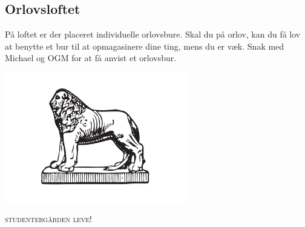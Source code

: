 \documentclass[11pt,article,twoside,openany,danish,extrafontsizes]{memoir} %
\begin{document}
\subsection{Orlovsloftet}
På loftet er der placeret individuelle orlovsbure. Skal du på orlov, kan du få lov at benytte et bur til at opmagasinere dine ting, mens du er væk. Snak med Michael og OGM for at få anvist et orlovsbur.




\clearpage

\thispagestyle{empty}
\begin{vplace}[0.75]
\begin{adjustwidth}{-2cm}{-1.5cm}
\begin{center}

\includegraphics[width=8cm]{fig/SG_loeve_vektor}

\bigskip

{\LARGE \scshape studentergården leve!}

\end{center}
\end{adjustwidth}
\end{vplace}
\end{document}
